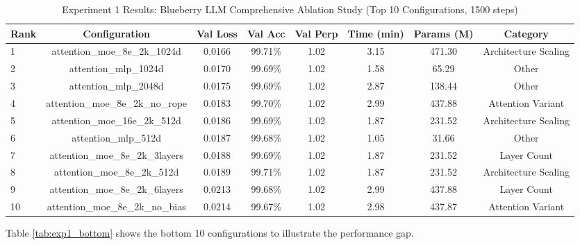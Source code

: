 \documentclass[11pt,a4paper]{article}
\begin{document}
\begin{table}[H]
\centering
\caption{Experiment 1 Results: Blueberry LLM Comprehensive Ablation Study (Top 10 Configurations, 1500 steps)}
\label{tab:exp1_results}
\begin{tabular}{@{}lccccccc@{}}
\toprule
Rank & Configuration & Val Loss & Val Acc & Val Perp & Time (min) & Params (M) & Category \\
\midrule
1 & attention\_moe\_8e\_2k\_1024d & 0.0166 & 99.71\% & 1.02 & 3.15 & 471.30 & Architecture Scaling \\
2 & attention\_mlp\_1024d & 0.0170 & 99.69\% & 1.02 & 1.58 & 65.29 & Other \\
3 & attention\_mlp\_2048d & 0.0175 & 99.69\% & 1.02 & 2.87 & 138.44 & Other \\
4 & attention\_moe\_8e\_2k\_no\_rope & 0.0183 & 99.70\% & 1.02 & 2.99 & 437.88 & Attention Variant \\
5 & attention\_moe\_16e\_2k\_512d & 0.0186 & 99.69\% & 1.02 & 1.87 & 231.52 & Architecture Scaling \\
6 & attention\_mlp\_512d & 0.0187 & 99.68\% & 1.02 & 1.05 & 31.66 & Other \\
7 & attention\_moe\_8e\_2k\_3layers & 0.0188 & 99.69\% & 1.02 & 1.87 & 231.52 & Layer Count \\
8 & attention\_moe\_8e\_2k\_512d & 0.0189 & 99.71\% & 1.02 & 1.87 & 231.52 & Architecture Scaling \\
9 & attention\_moe\_8e\_2k\_6layers & 0.0213 & 99.68\% & 1.02 & 2.99 & 437.88 & Layer Count \\
10 & attention\_moe\_8e\_2k\_no\_bias & 0.0214 & 99.67\% & 1.02 & 2.98 & 437.87 & Attention Variant \\
\bottomrule
\end{tabular}
\end{table}

Table \ref{tab:exp1_bottom} shows the bottom 10 configurations to illustrate the performance gap.
\end{document}
